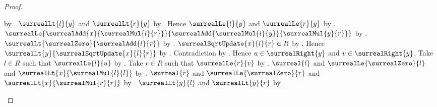 \begin{proof}
\begin{subproof}
\begin{byCase}
\begin{byCase}
\begin{byCase}
                                by \auto.
                            $\surrealLt{l}{y}$ and
                                $\surrealLt{r}{y}$
                                by .
                            Hence $\surrealLe{l}{y}$ and
                                $\surrealLe{r}{y}$
                                by .
                            $\surrealLe{
                                \surrealAdd{x}{\surrealMul{l}{r}}}{
                                \surrealAdd{\surrealMul{l}{y}}{
                                    \surrealMul{y}{r}}}$
                                by
                                .
                            $\surrealLt{\surrealZero}{
                                \surrealAdd{l}{r}}$
                                by
                                .
                            $\surrealSqrtUpdate{x}{l}{r}\in R$
                                by
                                .
                            Hence $\surrealLt{y}{
                                \surrealSqrtUpdate{x}{l}{r}}$
                                by .
                            Contradiction by
                                .
                            Hence $u\in\surrealRight{y}$ and
                                $v\in\surrealRight{y}$.
                            Take $l\in R$ such that
                                $\surrealLe{l}{u}$
                                by .
                            Take $r\in R$ such that
                                $\surrealLe{r}{v}$
                                by .
                            $\surreal{l}$ and
                                $\surrealLe{\surrealZero}{l}$ and
                                $\surrealLt{x}{\surrealMul{l}{l}}$
                                by \auto.
                            $\surreal{r}$ and
                                $\surrealLe{\surrealZero}{r}$ and
                                $\surrealLt{x}{\surrealMul{r}{r}}$
                                by \auto.
                            $\surrealLt{y}{l}$ and
                                $\surrealLt{y}{r}$
                                by .

\end{byCase}
\end{byCase}
\end{byCase}
\end{subproof}
\end{proof}
